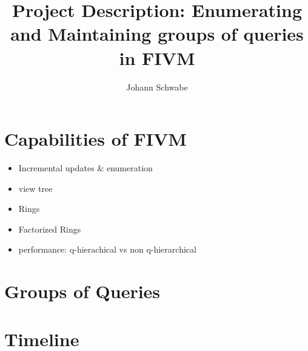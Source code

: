 \documentclass[]{article}
\title{Project Description: Enumerating and Maintaining groups of queries in FIVM}
\author{Johann Schwabe}
\begin{document}
\maketitle


\section{Capabilities of FIVM}
\begin{itemize}
	\item Incremental updates \& enumeration
	\item view tree
	\item Rings
	\item Factorized Rings
	\item performance: q-hierachical vs non q-hierarchical
	
\end{itemize}
\section{Groups of Queries}
\section{Timeline}
\end{document}
